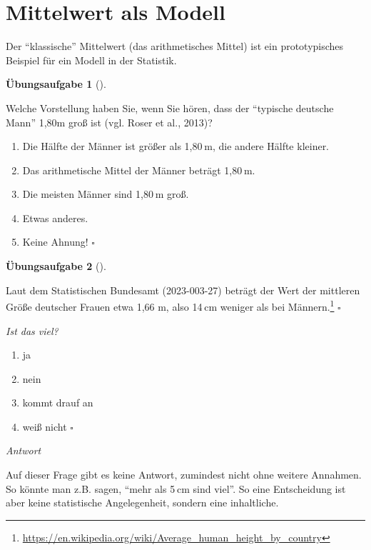 \documentclass[
  letterpaper,
  oneside,
  open=any]{scrbook}
\providecommand{\tightlist}{%
  \setlength{\itemsep}{0pt}\setlength{\parskip}{0pt}}\usepackage{longtable,booktabs,array}
\theoremstyle{definition}
\newtheorem{exercise}{Übungsaufgabe}[chapter]
\theoremstyle{definition}
\theoremstyle{definition}
\theoremstyle{remark}
\begin{document}
\section{Mittelwert als Modell}\label{sec-mw}

Der \enquote{klassische} Mittelwert (das arithmetisches Mittel) ist ein
prototypisches Beispiel für ein Modell in der Statistik.

\begin{exercise}[]\protect\hypertarget{exr-mw-md-mod}{}\label{exr-mw-md-mod}

Welche Vorstellung haben Sie, wenn Sie hören, dass der \enquote{typische
deutsche Mann} 1,80m groß ist (vgl. Roser et al., 2013)?

\begin{enumerate}
\def\labelenumi{\alph{enumi})}
\tightlist
\item
  Die Hälfte der Männer ist größer als 1,80 m, die andere Hälfte
  kleiner.
\item
  Das arithmetische Mittel der Männer beträgt 1,80 m.
\item
  Die meisten Männer sind 1,80 m groß.
\item
  Etwas anderes.
\item
  Keine Ahnung! \(\square\)
\end{enumerate}

\end{exercise}

\begin{exercise}[]\protect\hypertarget{exr-mw2}{}\label{exr-mw2}

Laut dem Statistischen Bundesamt (2023-003-27) beträgt der Wert der
mittleren Größe deutscher Frauen etwa 1,66 m, also 14 cm weniger als bei
Männern.\footnote{\url{https://en.wikipedia.org/wiki/Average_human_height_by_country}}
\(\square\)

\emph{Ist das viel?}

\begin{enumerate}
\def\labelenumi{\alph{enumi})}
\tightlist
\item
  ja
\item
  nein
\item
  kommt drauf an
\item
  weiß nicht \(\square\)
\end{enumerate}

\emph{Antwort}

Auf dieser Frage gibt es keine Antwort, zumindest nicht ohne weitere
Annahmen. So könnte man z.B. sagen, \enquote{mehr als 5 cm sind viel}.
So eine Entscheidung ist aber keine statistische Angelegenheit, sondern
eine inhaltliche.

\end{exercise}
\end{document}
